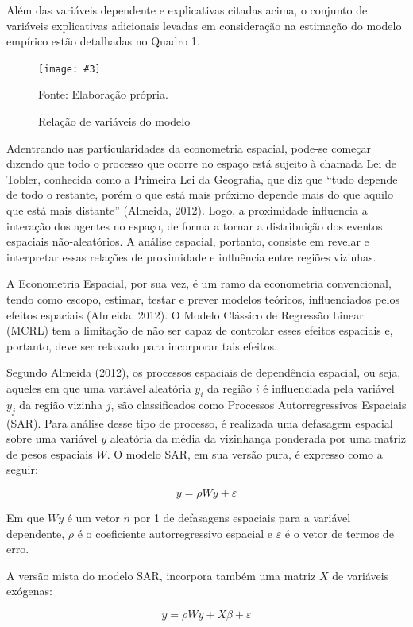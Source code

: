 \documentclass[a4paper,12pt]{article}
\newcommand{\quadro}[4]{%
  \renewcommand{\figurename}{Quadro}
  \setcounter{figure}{0}
  \begin{figure}[H]
    \captionsetup{list=no}
    \centering
    \caption{#1}
    \label{#2}
    \texttt{[image: \#3]}
    
    \vspace{0.5cm}
    
    \begin{footnotesize}
      Fonte: #4
    \end{footnotesize}
  \end{figure}
}
\renewcommand*\figurename{Figura}
\newcommand\figurename{Figura}
\begin{document}
Além das variáveis dependente e explicativas citadas acima, o conjunto
de variáveis explicativas adicionais levadas em consideração na
estimação do modelo empírico estão detalhadas no Quadro 1.

\quadro{Relação de variáveis do modelo}{fig:quadro}{exports/quadro1.pdf}{Elaboração própria.}

Adentrando nas particularidades da econometria espacial, pode-se começar
dizendo que todo o processo que ocorre no espaço está sujeito à chamada
Lei de Tobler, conhecida como a Primeira Lei da Geografia, que diz que
``tudo depende de todo o restante, porém o que está mais próximo depende
mais do que aquilo que está mais distante'' (Almeida, 2012). Logo, a
proximidade influencia a interação dos agentes no espaço, de forma a
tornar a distribuição dos eventos espaciais não-aleatórios. A análise
espacial, portanto, consiste em revelar e interpretar essas relações de
proximidade e influência entre regiões vizinhas.

A Econometria Espacial, por sua vez, é um ramo da econometria
convencional, tendo como escopo, estimar, testar e prever modelos
teóricos, influenciados pelos efeitos espaciais (Almeida, 2012). O
Modelo Clássico de Regressão Linear (MCRL) tem a limitação de não ser
capaz de controlar esses efeitos espaciais e, portanto, deve ser
relaxado para incorporar tais efeitos.

Segundo Almeida (2012), os processos espaciais de dependência espacial,
ou seja, aqueles em que uma variável aleatória \(y_i\) da região \(i\) é
influenciada pela variável \(y_j\) da região vizinha \(j\), são
classificados como Processos Autorregressivos Espaciais (SAR). Para
análise desse tipo de processo, é realizada uma defasagem espacial sobre
uma variável \(y\) aleatória da média da vizinhança ponderada por uma
matriz de pesos espaciais \(W\). O modelo SAR, em sua versão pura, é
expresso como a seguir:

\begin{equation}
y = \rho Wy + \varepsilon
\end{equation}

Em que \(Wy\) é um vetor \(n\) por 1 de defasagens espaciais para a
variável dependente, \(\rho\) é o coeficiente autorregressivo espacial e
\(\varepsilon\) é o vetor de termos de erro.

A versão mista do modelo SAR, incorpora também uma matriz \(X\) de
variáveis exógenas:

\begin{equation}
y = \rho Wy + X \beta + \varepsilon
\end{equation}
\end{document}

